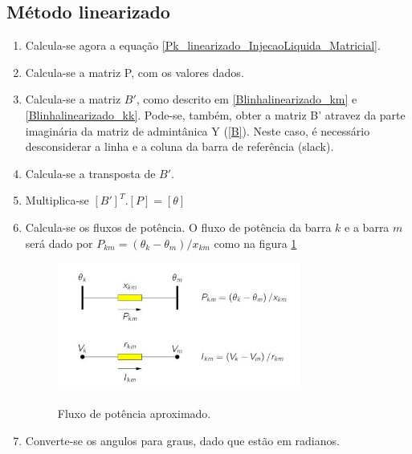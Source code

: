 \subsection{Método linearizado}
\label{SubsectionMetodoLinearizado}
\begin{enumerate}
    \item Calcula-se agora a equação \ref{Pk_linearizado_InjecaoLiquida_Matricial}.
    \item Calcula-se a matriz P, com os valores dados.
    \item Calcula-se a matriz $B'$, como descrito em \ref{Blinhalinearizado_km} e \ref{Blinhalinearizado_kk}. Pode-se, também, obter a matriz B' atravez da parte imaginária da matriz de admintânica Y (\ref{B}). Neste caso, é necessário desconsiderar a linha e a coluna da barra de referência (slack). 
    \item Calcula-se a transposta de $B'$. 
    \item Multiplica-se $[B']^T.[P]=[\theta]$
    \item Calcula-se os fluxos de potência. O fluxo de potência da barra $k$ e a barra $m$ será dado por $P_{km} = (\theta_k - \theta_m)/x_{km}$ como na figura \ref{FigFluxoPotenciaLinearizado}
        \begin{figure}[!htb]
            \caption{Fluxo de potência aproximado. \cite{castro}}
            \centering %
            \includegraphics[width=8cm]{figuras/FluxoLinearizado.JPG}
            \label{FigFluxoPotenciaLinearizado}
        \end{figure}
    \item Converte-se os angulos para graus, dado que estão em radianos.
\end{enumerate}
